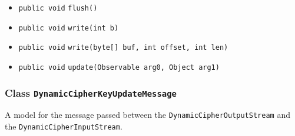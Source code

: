 \begin{itemize}
\item \lstinline|public void| \lstinline|flush|\lstinline|()| \\[-0.6em]




\item \lstinline|public void| \lstinline|write|\lstinline|(int b)| \\[-0.6em]




\item \lstinline|public void| \lstinline|write|\lstinline|(byte[] buf, int offset, int len)| \\[-0.6em]




\item \lstinline|public void| \lstinline|update|\lstinline|(Observable arg0, Object arg1)| \\[-0.6em]




\end{itemize}

\subsubsection{Class \lstinline|DynamicCipherKeyUpdateMessage|}
A model for the message passed between the \lstinline|DynamicCipherOutputStream|
 and the \lstinline|DynamicCipherInputStream|. \\
\noindent\begin{minipage}[t]{5cm}
\vspace{0.3em}
\hspace*{2em}
\vspace{0.3em}
\end{minipage}




